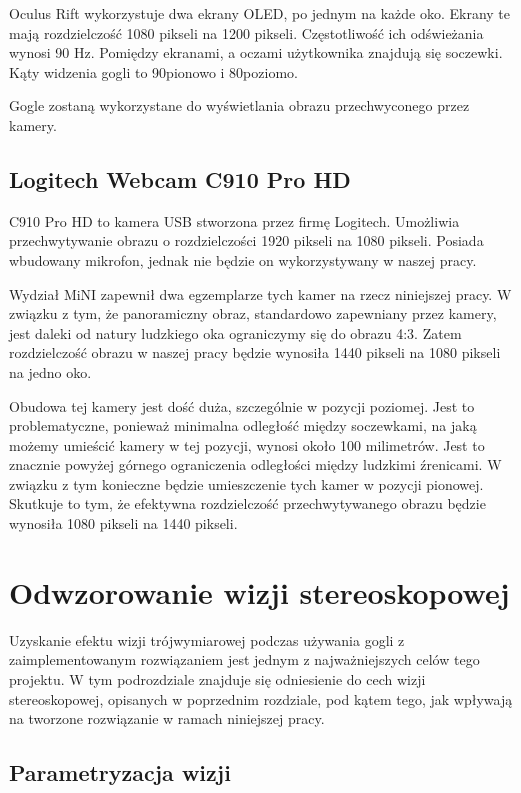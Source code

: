 \documentclass[a4paper,11pt,twoside]{report}
\theoremstyle{definition}
\begin{document}
Oculus Rift wykorzystuje dwa ekrany OLED, po jednym na każde oko. Ekrany te mają rozdzielczość 1080 pikseli na 1200 pikseli. Częstotliwość ich odświeżania wynosi 90 Hz. Pomiędzy ekranami, a oczami użytkownika znajdują się soczewki. Kąty widzenia gogli to 90\textdegree  pionowo i 80\textdegree  poziomo.

Gogle zostaną wykorzystane do wyświetlania obrazu przechwyconego przez kamery.

\subsection{Logitech Webcam C910 Pro HD}

C910 Pro HD to kamera USB stworzona przez firmę Logitech. Umożliwia przechwytywanie obrazu o rozdzielczości 1920 pikseli na 1080 pikseli. Posiada wbudowany mikrofon, jednak nie będzie on wykorzystywany w naszej pracy.

Wydział MiNI zapewnił dwa egzemplarze tych kamer na rzecz niniejszej pracy. W związku z tym, że panoramiczny obraz, standardowo zapewniany przez kamery, jest daleki od natury ludzkiego oka ograniczymy się do obrazu 4:3. Zatem rozdzielczość obrazu w naszej pracy będzie wynosiła 1440 pikseli na 1080 pikseli na jedno oko.

Obudowa tej kamery jest dość duża, szczególnie w pozycji poziomej. Jest to problematyczne, ponieważ minimalna odległość między soczewkami, na jaką możemy umieścić kamery w tej pozycji, wynosi około 100 milimetrów. Jest to znacznie powyżej górnego ograniczenia odległości między ludzkimi źrenicami. W związku z tym konieczne będzie umieszczenie tych kamer w pozycji pionowej. Skutkuje to tym, że efektywna rozdzielczość przechwytywanego obrazu będzie wynosiła 1080 pikseli na 1440 pikseli.

\section{Odwzorowanie wizji stereoskopowej}

Uzyskanie efektu wizji trójwymiarowej podczas używania gogli z zaimplementowanym rozwiązaniem jest jednym z najważniejszych celów tego projektu. W tym podrozdziale znajduje się odniesienie do cech wizji stereoskopowej, opisanych w poprzednim rozdziale, pod kątem tego, jak wpływają na tworzone rozwiązanie w ramach niniejszej pracy. 

\pagebreak
\subsection {Parametryzacja wizji}
\end{document}
